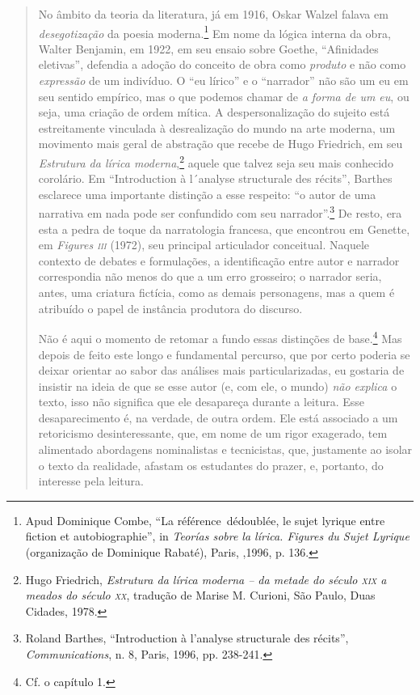 \begin{quote}
No âmbito da teoria da literatura, já em 1916, Oskar Walzel falava em
\emph{desegotização} da poesia moderna.\footnote{Apud Dominique Combe,
  ``La référence~dédoublée, le sujet lyrique entre fiction et
  autobiographie'', in \emph{Teorías sobre la lírica. Figures du Sujet
  Lyrique} (organização de Dominique Rabaté), Paris, ,1996, p. 136.}
Em nome da lógica interna da obra, Walter Benjamin, em 1922, em seu
ensaio sobre Goethe, ``Afinidades eletivas'', defendia a adoção do
conceito de obra como \emph{produto} e não como \emph{expressão} de um
indivíduo. O ``eu lírico'' e o ``narrador'' não são um eu em seu sentido
empírico, mas o que podemos chamar de \emph{a forma de um eu}, ou seja,
uma criação de ordem mítica. A despersonalização do sujeito está
estreitamente vinculada à desrealização do mundo na arte moderna, um
movimento mais geral de abstração que recebe de Hugo Friedrich, em seu
\emph{Estrutura da lírica moderna},\footnote{Hugo Friedrich,
  \emph{Estrutura da lírica moderna -- da metade do século \textsc{xix}
  a meados do século \textsc{xx}}, tradução de Marise M. Curioni, São
  Paulo, Duas Cidades, 1978.} aquele que talvez seja seu mais conhecido
corolário. Em ``Introduction à l´analyse structurale des récits'',
Barthes esclarece uma importante distinção a esse respeito: ``o autor de
uma narrativa em nada pode ser confundido com seu narrador''.\footnote{Roland
  Barthes, ``Introduction à l'analyse structurale des récits'',
  \emph{Communications}, n. 8, Paris, 1996, pp. 238-241.} De resto, era
esta a pedra de toque da narratologia francesa, que encontrou em
Genette, em \emph{Figures \textsc{iii}} (1972), seu principal
articulador conceitual. Naquele contexto de debates e formulações, a
identificação entre autor e narrador correspondia não menos do que a um
erro grosseiro; o narrador seria, antes, uma criatura fictícia, como as
demais personagens, mas a quem é atribuído o papel de instância
produtora do discurso.

Não é aqui o momento de retomar a fundo essas distinções de
base.\footnote{Cf. o capítulo 1.} Mas depois de feito este longo e
fundamental percurso, que por certo poderia se deixar orientar ao sabor
das análises mais particularizadas, eu gostaria de insistir na ideia de
que se esse autor (e, com ele, o mundo) \emph{não explica} o texto, isso
não significa que ele desapareça durante a leitura. Esse desaparecimento
é, na verdade, de outra ordem. Ele está associado a um retoricismo
desinteressante, que, em nome de um rigor exagerado, tem alimentado
abordagens nominalistas e tecnicistas, que, justamente ao isolar o texto
da realidade, afastam os estudantes do prazer, e, portanto, do interesse
pela leitura.


\end{quote}
